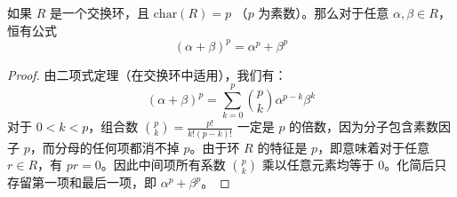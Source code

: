 \documentclass[11pt]{article}
\begin{document}
\begin{cnproperty}
如果 $R$ 是一个交换环，且 $\text{char}(R) = p$ （$p$ 为素数）。那么对于任意 $\alpha, \beta \in R$，恒有公式
$$(\alpha + \beta)^p = \alpha^p + \beta^p$$
\end{cnproperty}
\begin{proof}
由二项式定理（在交换环中适用），我们有：
$$(\alpha + \beta)^p = \sum_{k=0}^{p} \binom{p}{k} \alpha^{p-k} \beta^k$$
对于 $0 < k < p$，组合数 $\binom{p}{k} = \frac{p!}{k!(p-k)!}$ 一定是 $p$ 的倍数，因为分子包含素数因子 $p$，而分母的任何项都消不掉 $p$。由于环 $R$ 的特征是 $p$，即意味着对于任意 $r \in R$，有 $pr = 0$。因此中间项所有系数 $\binom{p}{k}$ 乘以任意元素均等于 $0$。化简后只存留第一项和最后一项，即 $\alpha^p + \beta^p$。
\end{proof}
\end{document}
